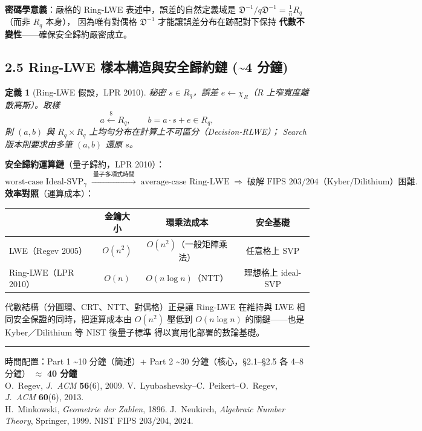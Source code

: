 \documentclass[10.5pt, a4paper]{article}
\theoremstyle{cpt}
\newtheorem{definition}{定義}
\begin{document}
\textbf{密碼學意義}：嚴格的 Ring-LWE 表述中，誤差的自然定義域是
$\mathfrak{D}^{-1}/q\mathfrak{D}^{-1} = \tfrac{1}{n}R_q$（而非 $R_q$ 本身），
因為唯有對偶格 $\mathfrak{D}^{-1}$ 才能讓誤差分布在跡配對下保持
\textbf{代數不變性}——確保安全歸約嚴密成立。

\subsection{2.5 \;Ring-LWE 樣本構造與安全歸約鏈 \hfill {\footnotesize\color{gray}(\textasciitilde 4 分鐘)}}

\begin{definition}[Ring-LWE 假設，LPR 2010]
  秘密 $s\in R_q$，誤差 $e\leftarrow\chi_R$（$R$ 上窄寬度離散高斯）。取樣
  \[
    a \xleftarrow{\$} R_q,\qquad b = a\cdot s + e \in R_q,
  \]
  則 $(a,b)$ 與 $R_q\times R_q$ 上均勻分布在計算上不可區分（Decision-RLWE）；
  Search 版本則要求由多筆 $(a,b)$ 還原 $s$。
\end{definition}

\textbf{安全歸約運算鏈}（量子歸約，LPR 2010）：
\[
  \text{worst-case Ideal-SVP}_\gamma
  \;\xrightarrow{\ \text{量子多項式時間}\ }\;
  \text{average-case Ring-LWE}
  \;\Longrightarrow\;
  \text{破解 FIPS 203/204（Kyber/Dilithium）困難}.
\]
\textbf{效率對照}（運算成本）：

\begin{center}\small
\begin{tabular}{l c c c}
\hline
& 金鑰大小 & 環乘法成本 & 安全基礎 \\
\hline
LWE（Regev 2005） & $O(n^2)$ & $O(n^2)$（一般矩陣乘法） & 任意格上 SVP \\
Ring-LWE（LPR 2010） & $O(n)$ & $O(n\log n)$（NTT） & 理想格上 ideal-SVP \\
\hline
\end{tabular}
\end{center}

代數結構（分圓環、CRT、NTT、對偶格）正是讓 Ring-LWE
在維持與 LWE 相同安全保證的同時，把運算成本由 $O(n^2)$ 壓低到
$O(n\log n)$ 的關鍵——也是 Kyber／Dilithium 等 NIST 後量子標準
得以實用化部署的數論基礎。

\vspace{4pt}
\noindent\rule{\linewidth}{0.4pt}
\begin{center}\small\color{gray}
  時間配置：Part 1 \textasciitilde 10 分鐘（簡述）\quad+\quad
  Part 2 \textasciitilde 30 分鐘（核心，§2.1–§2.5 各 4–8 分鐘）\quad
  $\approx$ \textbf{40 分鐘}\\[3pt]
  O.\ Regev, \textit{J.\ ACM} \textbf{56}(6), 2009.\;
  V.\ Lyubashevsky--C.\ Peikert--O.\ Regev, \textit{J.\ ACM} \textbf{60}(6), 2013.\\[1pt]
  H.\ Minkowski, \textit{Geometrie der Zahlen}, 1896.\;
  J.\ Neukirch, \textit{Algebraic Number Theory}, Springer, 1999.\;
  NIST FIPS 203/204, 2024.
\end{center}
\end{document}
